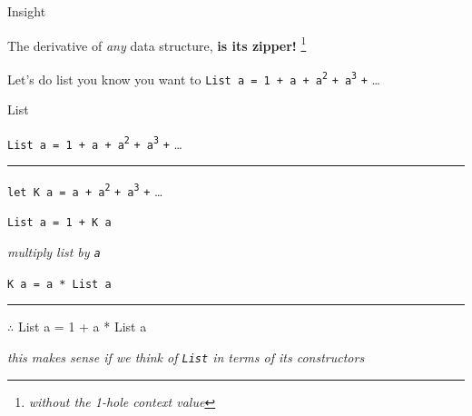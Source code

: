 \begin{frame}
\begin{block}{Insight}
\begin{center}
  The derivative of \emph{any} data structure, \textbf{is its zipper!}\cite{abbott2005data} \footnote{\emph{without the 1-hole context value}}
\end{center}
\end{block}
\end{frame}



\begin{frame}
\begin{block}{Let's do list \tiny{you know you want to}}
\lstinline{List a = 1 + a + a}\textsuperscript{\lstinline{2}} \lstinline{+ a}\textsuperscript{\lstinline{3}} \lstinline{+} \ldots
\end{block}
\end{frame}

\begin{frame}{List}

\lstinline{List a = 1 + a + a}\textsuperscript{\lstinline{2}} \lstinline{+ a}\textsuperscript{\lstinline{3}} \lstinline{+} \ldots

\par\noindent\rule{\textwidth}{0.4pt}

\lstinline{let K a = a + a}\textsuperscript{\lstinline{2}} \lstinline{+ a}\textsuperscript{\lstinline{3}} \lstinline{+} \ldots

\lstinline{List a = 1 + K a}

\emph{\tiny{multiply list by \lstinline{a}}}

\lstinline{K a = a * List a}

\par\noindent\rule{\textwidth}{0.4pt}

{$\therefore$} List a = 1 + a * List a

\emph{\tiny{this makes sense if we think of \lstinline{List} in terms of its constructors}}

\end{frame}



